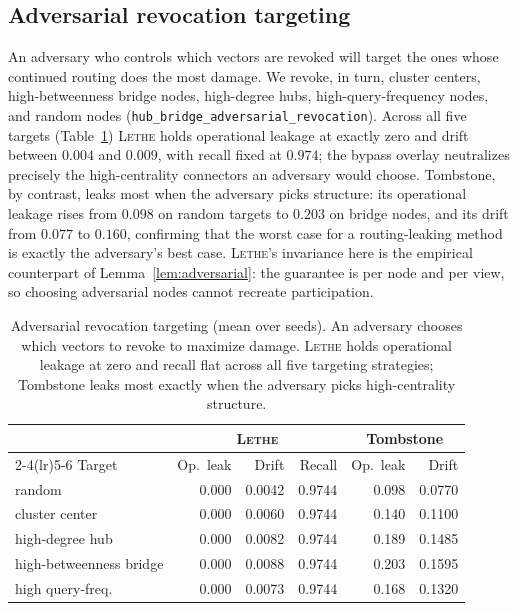 \documentclass[sigconf, nonacm, review]{acmart}
\begin{document}
\subsection{Adversarial revocation targeting}
\label{app:sec-adv}
An adversary who controls which vectors are revoked will target the ones whose
continued routing does the most damage. We revoke, in turn, cluster centers,
high-betweenness bridge nodes, high-degree hubs, high-query-frequency nodes, and
random nodes (\texttt{hub\_bridge\_adversarial\_revocation}). Across all five
targets (Table~\ref{tab:targeting}) \textsc{Lethe} holds operational leakage at exactly zero and drift
between $0.004$ and $0.009$, with recall fixed at $0.974$; the bypass overlay
neutralizes precisely the high-centrality connectors an adversary would choose.
Tombstone, by contrast, leaks most when the adversary picks structure: its
operational leakage rises from $0.098$ on random targets to $0.203$ on bridge
nodes, and its drift from $0.077$ to $0.160$, confirming that the worst case for
a routing-leaking method is exactly the adversary's best case. \textsc{Lethe}'s
invariance here is the empirical counterpart of
Lemma~\ref{lem:adversarial}: the guarantee is per node and per view, so choosing
adversarial nodes cannot recreate participation.

\begin{table}[t]
\centering
\caption{Adversarial revocation targeting (mean over seeds). An adversary
chooses which vectors to revoke to maximize damage. \textsc{Lethe} holds
operational leakage at zero and recall flat across all five targeting
strategies; Tombstone leaks most exactly when the adversary picks
high-centrality structure.}
\label{tab:targeting}
\small
\begin{tabular}{@{}lrrrrr@{}}
\toprule
& \multicolumn{3}{c}{\textsc{Lethe}} & \multicolumn{2}{c}{Tombstone} \\
\cmidrule(lr){2-4}\cmidrule(lr){5-6}
Target & Op.\ leak & Drift & Recall & Op.\ leak & Drift \\
\midrule
random & 0.000 & 0.0042 & 0.9744 & 0.098 & 0.0770 \\
cluster center & 0.000 & 0.0060 & 0.9744 & 0.140 & 0.1100 \\
high-degree hub & 0.000 & 0.0082 & 0.9744 & 0.189 & 0.1485 \\
high-betweenness bridge & 0.000 & 0.0088 & 0.9744 & 0.203 & 0.1595 \\
high query-freq. & 0.000 & 0.0073 & 0.9744 & 0.168 & 0.1320 \\
\bottomrule
\end{tabular}
\end{table}
\end{document}
